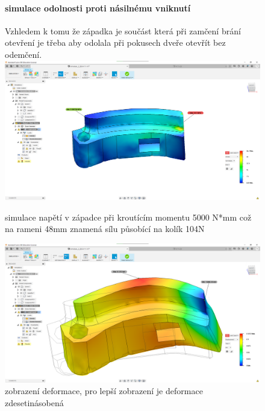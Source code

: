 \begin{figure}[htbp]
    \paragraph{simulace odolnosti proti násilnému vniknutí}
    Vzhledem k tomu že západka je součást která při zamčení brání otevření je třeba aby odolala při pokusech dveře otevřít bez odemčení.
    \centering
    \includegraphics[width=\textwidth]{kapitoly/obrazky/E4/zapadka/simulace/napeti_D1-M5000.png}
    \caption{simulace napětí v západce při kroutícím momentu 5000 N*mm což na rameni 48mm znamená sílu působící na kolík 104N}
    \includegraphics[width=\textwidth]{kapitoly/obrazky/E4/zapadka/simulace/Dislokace_D10-M5000.png}
    \caption{zobrazení deformace, pro lepší zobrazení je deformace zdesetinásobená}
    \label{fig:M1}
\end{figure}




\newpage